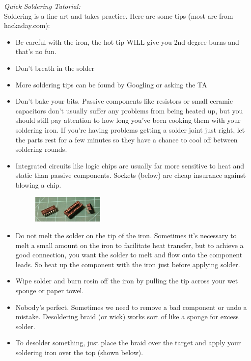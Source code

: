 \documentclass[12pt]{article}
\begin{document}
\begin{enumerate}[1.]
{\it Quick Soldering Tutorial:}\\
Soldering is a fine art and takes practice. 
Here are some tips (most are from hackaday.com):
\begin{itemize}
  \item Be careful with the iron, the hot tip WILL give you 2nd degree burns and that's no fun.
  \item Don't breath in the solder
  \item More soldering tips can be found by Googling or asking the TA
\item Don't bake your bits. 
Passive components like resistors or small ceramic capacitors don't usually suffer any problems from being heated up, but you should still pay attention to how long you've been cooking them with your soldering iron. 
If you're having problems getting a solder joint just right, let the parts rest for a few minutes so they have a chance to cool off between soldering rounds.
\item Integrated circuits like logic chips are usually far more sensitive to heat and static than passive components. 
Sockets (below) are cheap insurance against blowing a chip.
\begin{figure}[!ht]
\begin{center}
\includegraphics[width=0.33\textwidth,trim=0 0 0 0,clip=false]{sockets.png}
\end{center}
\end{figure}
\item Do not melt the solder on the tip of the iron. 
Sometimes it's necessary to melt a small amount on the iron to facilitate heat transfer, 
but to achieve a good connection, you want the solder to melt and flow onto the component leads. 
So heat up the component with the iron just before applying solder.
\item Wipe solder and burn rosin off the iron by pulling the tip across your wet sponge or paper towel.
\item Nobody's perfect. 
Sometimes we need to remove a bad component or undo a mistake. 
Desoldering braid (or wick) works sort of like a sponge for excess solder.
\item To desolder something, just place the braid over the target and apply your soldering iron over the top (shown below). 

\end{itemize}
\end{enumerate}
\end{document}
